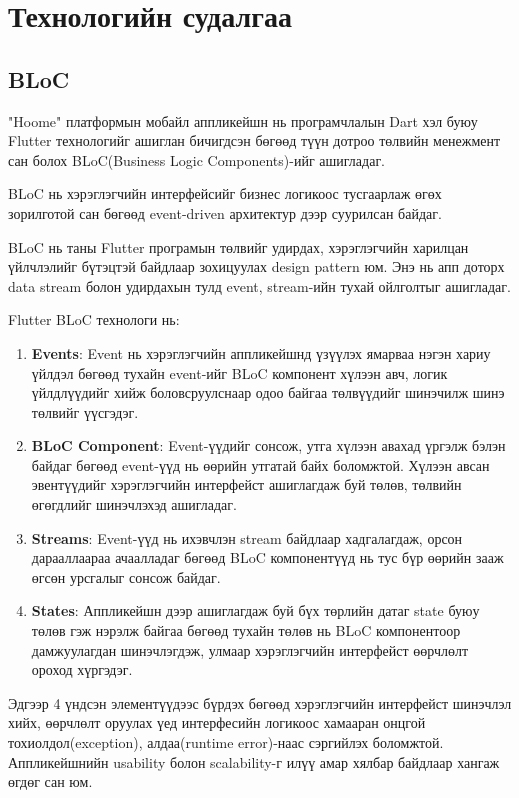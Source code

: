 \chapter{Технологийн судалгаа}
\section{BLoC}
"Hoome" платформын мобайл аппликейшн нь програмчлалын Dart хэл буюу Flutter технологийг ашиглан бичигдсэн бөгөөд түүн дотроо төлвийн менежмент сан болох BLoC(Business Logic Components)-ийг ашигладаг. 

BLoC нь хэрэглэгчийн интерфейсийг бизнес логикоос тусгаарлаж өгөх зорилготой сан бөгөөд event-driven архитектур дээр суурилсан байдаг. 

BLoC нь таны Flutter програмын төлвийг удирдах, хэрэглэгчийн харилцан үйлчлэлийг бүтэцтэй байдлаар зохицуулах design pattern юм. Энэ нь апп доторх data stream болон удирдахын тулд event, stream-ийн тухай ойлголтыг ашигладаг.

Flutter BLoC технологи нь:

\begin{enumerate}
  \item \textbf{Events}: Event нь хэрэглэгчийн аппликейшнд үзүүлэх ямарваа нэгэн хариу үйлдэл бөгөөд тухайн event-ийг BLoC компонент хүлээн авч, логик үйлдлүүдийг хийж боловсруулснаар одоо байгаа төлвүүдийг шинэчилж шинэ төлвийг үүсгэдэг.
  \item \textbf{BLoC Component}: Event-үүдийг сонсож, утга хүлээн авахад үргэлж бэлэн байдаг бөгөөд event-үүд нь өөрийн утгатай байх боломжтой. Хүлээн авсан эвентүүдийг хэрэглэгчийн интерфейст ашиглагдаж буй төлөв, төлвийн өгөгдлийг шинэчлэхэд ашигладаг.
  \item \textbf{Streams}: Event-үүд нь ихэвчлэн stream байдлаар хадгалагдаж, орсон дарааллаараа ачаалладаг бөгөөд BLoC компонентүүд нь тус бүр өөрийн зааж өгсөн урсгалыг сонсож байдаг.
  \item \textbf{States}: Аппликейшн дээр ашиглагдаж буй бүх төрлийн датаг state буюу төлөв гэж нэрэлж байгаа бөгөөд тухайн төлөв нь BLoC компонентоор дамжуулагдан шинэчлэгдэж, улмаар хэрэглэгчийн интерфейст өөрчлөлт ороход хүргэдэг. 
\end{enumerate}

Эдгээр 4 үндсэн элементүүдээс бүрдэх бөгөөд хэрэглэгчийн интерфейст шинэчлэл хийх, өөрчлөлт оруулах үед интерфесийн логикоос хамааран онцгой тохиолдол(exception), алдаа(runtime error)-наас сэргийлэх боломжтой. Аппликейшнийн usability болон scalability-г илүү амар хялбар байдлаар хангаж өгдөг сан юм. 


